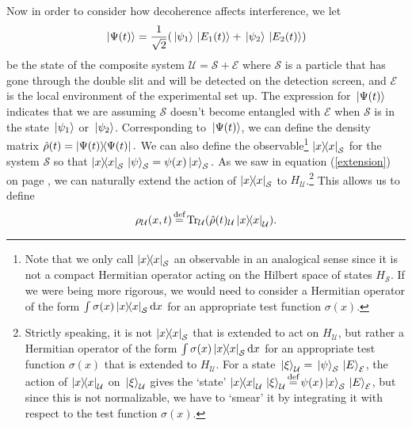     Now in order to consider how decoherence affects interference, we let $$\ket*{\Psi(t)}=\frac{1}{\sqrt{2}}(\ket*{\psi_1}\ket*{E_1(t)}+\ket*{\psi_2}\ket*{E_2(t)})$$ be the state of the composite system $\mathcal{U}=\mathcal{S}+\mathcal{E}$ where $\mathcal{S}$ is a particle that has gone through the double slit and will be detected on the detection screen, and $\mathcal{E}$ is the local environment of the experimental set up. The expression for $\ket*{\Psi(t)}$ indicates that we are assuming  $\mathcal{S}$ doesn't become entangled with $\mathcal{E}$ when $\mathcal{S}$ is in the state $\ket*{\psi_1}$ or $\ket*{\psi_2}$. Corresponding to $\ket*{\Psi(t)}$, we can define the density matrix  $\hat{\rho}(t)=\dyad{\Psi(t)}.$  We can also define the observable\footnote{Note that we only call $\dyad{x}_\mathcal{S}$ an observable in an analogical sense since it is not a compact Hermitian operator acting on the Hilbert space of states $H_\mathcal{S}$. If we were being more rigorous, we would need to consider a Hermitian operator of the form $\int \sigma(x)\dyad{x}_\mathcal{S}\dd x$ for an appropriate test function $\sigma(x)$. } $\dyad{x}_\mathcal{S}$ for the system $\mathcal{S}$ so that $\dyad{x}_\mathcal{S}\ket*{\psi}_\mathcal{S}=\psi(x)\ket*{x}_\mathcal{S}.$ As we saw in equation (\ref{extension}) on page \pageref{extension}, we can naturally extend the action of $\dyad{x}_\mathcal{S}$ to $H_\mathcal{U}$.\footnote{Strictly speaking, it is not $\dyad{x}_\mathcal{S}$ that is extended to act on $H_\mathcal{U}$, but rather a Hermitian operator of the form $\int \sigma(x)\dyad{x}_\mathcal{S}\dd x$ for an appropriate test function $\sigma(x)$ that is extended to $H_\mathcal{U}$. For a state $\ket*{\xi}_\mathcal{U}=\ket*{\psi}_\mathcal{S}\ket*{E}_\mathcal{E}$, the action of $\dyad{x}_\mathcal{U}$ on $\ket*{\xi}_\mathcal{U}$ gives the `state' $\dyad{x}_\mathcal{U}\ket*{\xi}_\mathcal{U}\myeq\psi(x)\ket*{x}_\mathcal{S}\ket*{E}_\mathcal{E}$, but since this is not normalizable, we have to `smear' it by integrating it with respect to the test function $\sigma(x)$.}  
    This allows us to define 
    $$\rho_\mathcal{U}(x, t)\myeq\Tr_\mathcal{U}(\hat{\rho}(t)_\mathcal{U}\dyad{x}_\mathcal{U}).$$
